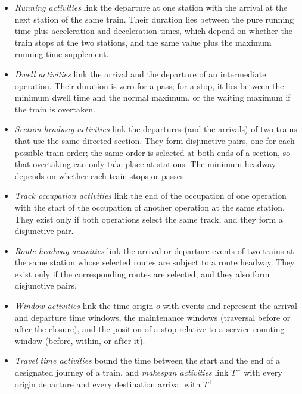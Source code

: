 \begin{itemize}
\item \emph{Running activities} link the departure at one station with the arrival at the next station of the same train. Their duration lies between the pure running time plus acceleration and deceleration times, which depend on whether the train stops at the two stations, and the same value plus the maximum running time supplement.
\item \emph{Dwell activities} link the arrival and the departure of an intermediate operation. Their duration is zero for a pass; for a stop, it lies between the minimum dwell time and the normal maximum, or the waiting maximum if the train is overtaken.
\item \emph{Section headway activities} link the departures (and the arrivals) of two trains that use the same directed section. They form disjunctive pairs, one for each possible train order; the same order is selected at both ends of a section, so that overtaking can only take place at stations. The minimum headway depends on whether each train stops or passes.
\item \emph{Track occupation activities} link the end of the occupation of one operation with the start of the occupation of another operation at the same station. They exist only if both operations select the same track, and they form a disjunctive pair.
\item \emph{Route headway activities} link the arrival or departure events of two trains at the same station whose selected routes are subject to a route headway. They exist only if the corresponding routes are selected, and they also form disjunctive pairs.
\item \emph{Window activities} link the time origin $o$ with events and represent the arrival and departure time windows, the maintenance windows (traversal before or after the closure), and the position of a stop relative to a service-counting window (before, within, or after it).
\item \emph{Travel time activities} bound the time between the start and the end of a designated journey of a train, and \emph{makespan activities} link $T^-$ with every origin departure and every destination arrival with $T^+$.
\end{itemize}

